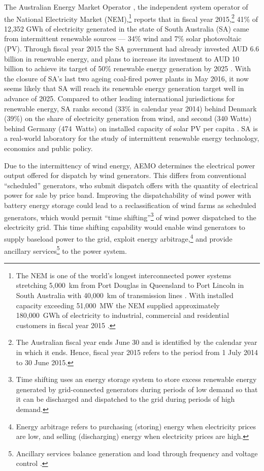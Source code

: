 The Australian Energy Market Operator \citeyearpar[AEMO,][]{SAER15}, the independent system operator of the National Electricity Market (NEM),\footnote{
The NEM is one of the world's longest interconnected power systems stretching 5,000~km from Port Douglas in Queensland to Port Lincoln in South Australia with 40,000~km of transmission lines \citep{AEMO14a}.  With installed capacity exceeding 51,000~MW the NEM supplied approximately 180,000~GWh of electricity to industrial, commercial and residential customers in fiscal year 2015 \citep{ESOO15, NEFR15}.
} reports that in fiscal year 2015,\footnote{
The Australian fiscal year ends June 30 and is identified by the calendar year in which it ends.  Hence, fiscal year 2015 refers to the period from 1 July 2014 to 30 June 2015.
} 41\% of 12,352 GWh of electricity generated in the state of South Australia (SA) came from intermittent renewable sources --- 34\% wind and 7\% solar photovoltaic (PV).  Through fiscal year 2015 the SA government had already invested AUD 6.6 billion in renewable energy, and plans to increase its investment to AUD 10 billion to achieve its target of 50\% renewable energy generation by 2025 \citep{SAGOV15}.  With the closure of SA's last two ageing coal-fired power plants in May 2016, it now seems likely that SA will reach its renewable energy generation target well in advance of 2025.  Compared to other leading international jurisdictions for renewable energy, SA ranks second (33\% in calendar year 2014) behind Denmark (39\%) on the share of electricity generation from wind, and second (340 Watts) behind Germany (474~Watts) on installed capacity of solar PV per capita \citep{SAGOV15}.  SA is a real-world laboratory for the study of intermittent renewable energy technology, economics and public policy.

Due to the intermittency of wind energy, AEMO determines the electrical power output offered for dispatch by wind generators.  This differs from conventional ``scheduled'' generators, who submit dispatch offers with the quantity of electrical power for sale by price band.  Improving the dispatchability of wind power with battery energy storage could lead to a reclassification of wind farms as scheduled generators, which would permit ``time shifting''\footnote{
Time shifting uses an energy storage system to store excess renewable energy generated by grid-connected generators during periods of low demand so that it can be discharged and dispatched to the grid during periods of high demand.
} of wind power dispatched to the electricity grid.  This time shifting capability would enable wind generators to supply baseload power to the grid, exploit energy arbitrage,\footnote{
Energy arbitrage refers to purchasing (storing) energy when electricity prices are low, and selling (discharging) energy when electricity prices are high.
} and provide ancillary services\footnote{
Ancillary services balance generation and load through frequency and voltage control \citep{AEMO15}.
} to the power system.

